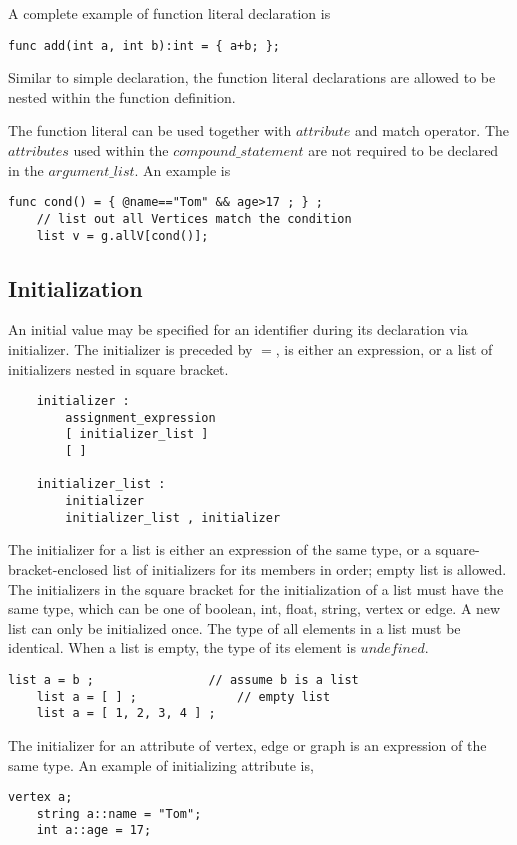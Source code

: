 \documentclass[letterpaper,12pt]{article}
\begin{document}
A complete example of function literal declaration is
\begin{lstlisting}[frame=none]
	func add(int a, int b):int = { a+b; };
\end{lstlisting}	 

Similar to simple declaration, the function literal declarations are allowed to be nested within the function definition. \newline

The function literal can be used together with $attribute$ and match operator. The $attributes$ used within the $compound\_statement$ are not required to be declared in the $argument\_list$. An example is
\begin{lstlisting}[frame=none] 
	func cond() = { @name=="Tom" && age>17 ; } ;
	// list out all Vertices match the condition
	list v = g.allV[cond()];
\end{lstlisting}

\subsection{Initialization}\label{sec:init}
An initial value may be specified for an identifier during its declaration via initializer. The initializer is preceded by $=$, is either an expression, or a list of initializers nested in square bracket.
\begin{lstlisting}
	initializer :
		assignment_expression
		[ initializer_list ]
		[ ]

	initializer_list :
		initializer
		initializer_list , initializer
\end{lstlisting}
The initializer for a list is either an expression of the same type, or a square-bracket-enclosed list of initializers for its members in order; empty list is allowed. The initializers in the square bracket for the initialization of a list must have the same type, which can be one of boolean, int, float, string, vertex or edge. A new list can only be initialized once. The type of all elements in a list must be identical. When a list is empty, the type of its element is $undefined$.
\begin{lstlisting}[frame=none]
	list a = b ; 				// assume b is a list
	list a = [ ] ;				// empty list
	list a = [ 1, 2, 3, 4 ] ;	
\end{lstlisting}

The initializer for an attribute of vertex, edge or graph is an expression of the same type. An example of initializing attribute is,
\begin{lstlisting}[frame=none]
	vertex a;
	string a::name = "Tom";
	int a::age = 17;
\end{lstlisting}
\end{document}
